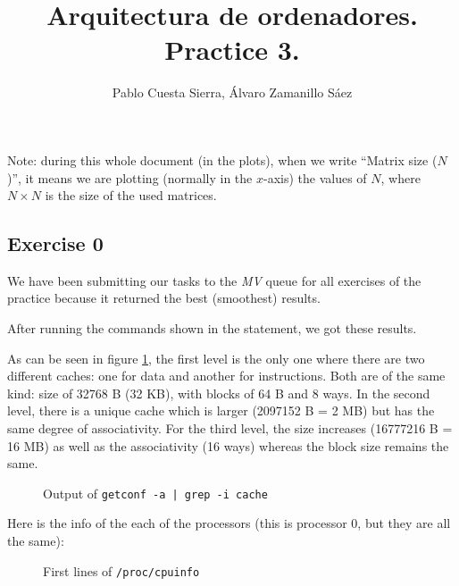 \documentclass{article}
\begin{document}
\title{Arquitectura de ordenadores. Practice 3.}
\author{Pablo Cuesta Sierra, Álvaro Zamanillo Sáez}
\maketitle


Note: during this whole document (in the plots), when we write ``Matrix size ($N$)'', it means we are plotting (normally in the $x$-axis) the values of $N$, where $N\times N$ is the size of the used matrices.

\subsection*{Exercise 0}

We have been submitting our tasks to the \emph{MV} queue for all exercises of the practice because it returned the best (smoothest) results. 

After running the commands shown in the statement, we got these results. 

As can be seen in figure \ref{cache_conf}, the first level is the only one where there are two different caches: one for data and another for instructions. Both are of the same kind: size of 32768 B (32 KB), with blocks of 64 B and 8 ways. 
In the second level, there is a unique cache which is larger (2097152 B = 2 MB) but has the same degree of associativity. For the third level, the size increases (16777216 B = 16 MB) as well as the associativity (16 ways) whereas the block size remains the same.

\begin{figure}[h]
    
    \centering
    \caption{Output of \texttt{getconf -a | grep -i cache}}
    \label{cache_conf}
\end{figure}

\pagebreak

Here is the info of the each of the processors (this is processor 0, but they are all the same):

\begin{figure}[h]
    
    \centering
    \caption{First lines of \texttt{/proc/cpuinfo}}
    \label{cpuinfo}
\end{figure}
\end{document}
